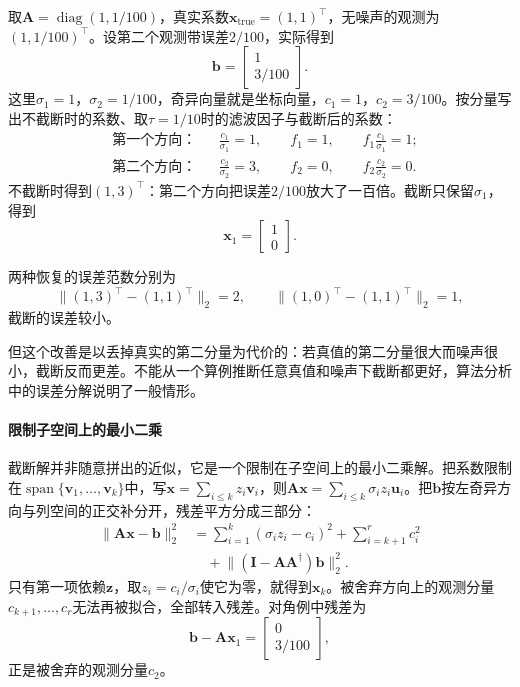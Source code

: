 \begin{example}[对角矩阵的谱截断]
\label{ex:ls-tsvd-diagonal}
取$\bm A=\operatorname{diag}(1,1/100)$，真实系数$\bm x_{\mathrm{true}}=(1,1)^\top$，无噪声的观测为$(1,1/100)^\top$。设第二个观测带误差$2/100$，实际得到
\[
 \bm b=\begin{bmatrix}1\\3/100\end{bmatrix}.
\]
这里$\sigma_1=1$，$\sigma_2=1/100$，奇异向量就是坐标向量，$c_1=1$，$c_2=3/100$。按分量写出不截断时的系数、取$\tau=1/10$时的滤波因子与截断后的系数：
\[
 \begin{aligned}
 &\text{第一个方向：}&& \frac{c_1}{\sigma_1}=1,\qquad f_1=1,\qquad f_1\frac{c_1}{\sigma_1}=1;\\
 &\text{第二个方向：}&& \frac{c_2}{\sigma_2}=3,\qquad f_2=0,\qquad f_2\frac{c_2}{\sigma_2}=0 .
 \end{aligned}
\]
不截断时得到$(1,3)^\top$：第二个方向把误差$2/100$放大了一百倍。截断只保留$\sigma_1$，得到
\[
 \bm x_1=\begin{bmatrix}1\\0\end{bmatrix}.
\]

两种恢复的误差范数分别为
\[
 \lVert(1,3)^\top-(1,1)^\top\rVert_2=2,\qquad \lVert(1,0)^\top-(1,1)^\top\rVert_2=1,
\]
截断的误差较小。

但这个改善是以丢掉真实的第二分量为代价的：若真值的第二分量很大而噪声很小，截断反而更差。不能从一个算例推断任意真值和噪声下截断都更好，算法分析中的误差分解说明了一般情形。
\end{example}

\paragraph{限制子空间上的最小二乘}
截断解并非随意拼出的近似，它是一个限制在子空间上的最小二乘解。把系数限制在$\operatorname{span}\{\bm v_1,\ldots,\bm v_k\}$中，写$\bm x=\sum_{i\leq k}z_i\bm v_i$，则$\bm A\bm x=\sum_{i\leq k}\sigma_iz_i\bm u_i$。把$\bm b$按左奇异方向与列空间的正交补分开，残差平方分成三部分：
\begin{equation}
 \begin{aligned}
 \lVert\bm A\bm x-\bm b\rVert_2^2
 &=\sum_{i=1}^k(\sigma_iz_i-c_i)^2+\sum_{i=k+1}^rc_i^2\\
 &\quad+\lVert(\bm I-\bm A\bm A^\dagger)\bm b\rVert_2^2 .
 \end{aligned}
 \label{eq:ls-tsvd-restricted-residual}
\end{equation}
只有第一项依赖$\bm z$，取$z_i=c_i/\sigma_i$使它为零，就得到$\bm x_k$。被舍弃方向上的观测分量$c_{k+1},\ldots,c_r$无法再被拟合，全部转入残差。对角例中残差为
\[
 \bm b-\bm A\bm x_1=\begin{bmatrix}0\\3/100\end{bmatrix},
\]
正是被舍弃的观测分量$c_2$。

